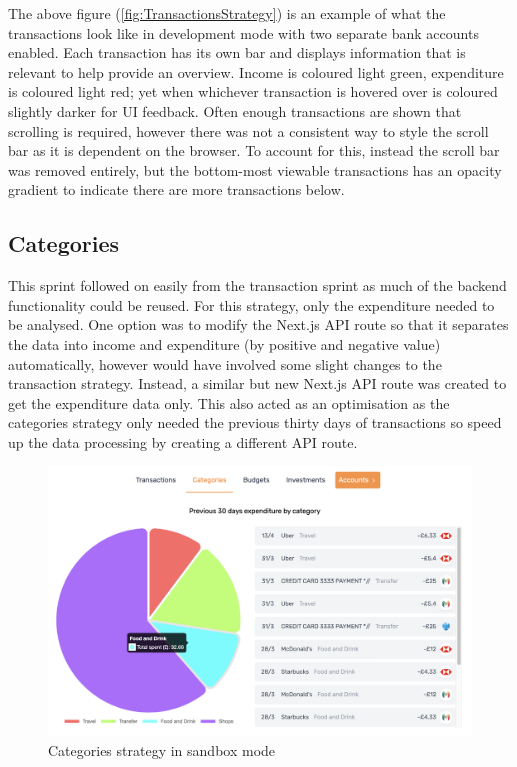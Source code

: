 The above figure (\ref{fig:TransactionsStrategy}) is an example of what the transactions look like in development mode with two separate bank accounts enabled. Each transaction has its own bar and displays information that is relevant to help provide an overview. Income is coloured light green, expenditure is coloured light red; yet when whichever transaction is hovered over is coloured slightly darker for UI feedback. Often enough transactions are shown that scrolling is required, however there was not a consistent way to style the scroll bar as it is dependent on the browser. To account for this, instead the scroll bar was removed entirely, but the bottom-most viewable transactions has an opacity gradient to indicate there are more transactions below.

\subsection{Categories}
This sprint followed on easily from the transaction sprint as much of the backend functionality could be reused. For this strategy, only the expenditure needed to be analysed. One option was to modify the Next.js API route so that it separates the data into income and expenditure (by positive and negative value) automatically, however would have involved some slight changes to the transaction strategy. Instead, a similar but new Next.js API route was created to get the expenditure data only. This also acted as an optimisation as the categories strategy only needed the previous thirty days of transactions so speed up the data processing by creating a different API route.

\begin{figure}[H]
	\centering
	\includegraphics[width=\textwidth]{images/Categories_sandbox.png}
	\caption{Categories strategy in sandbox mode}
	\label{fig:CategoriesStrategySandbox}
\end{figure}

